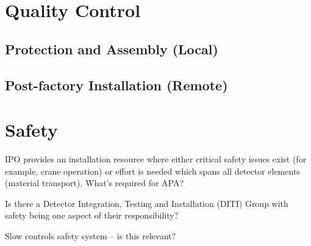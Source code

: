 \section{Quality Control}
\label{sec:fdsp-apa-qc}

\subsection{Protection and Assembly (Local)}
\label{sec:fdsp-apa-qc-local}


\subsection{Post-factory Installation (Remote)}
\label{sec:fdsp-apa-qc-remote}



\section{Safety}
\label{sec:fdsp-apa-safety}


IPO provides an installation resource where either critical safety issues exist (for example,  crane	
operation) or effort is needed which spans all	detector elements (material transport). What's required for APA?

Is there a Detector Integration, Testing and Installation (DITI) Group with safety being one aspect of their responsibility?

Slow controls safety system -- is this relevant?







